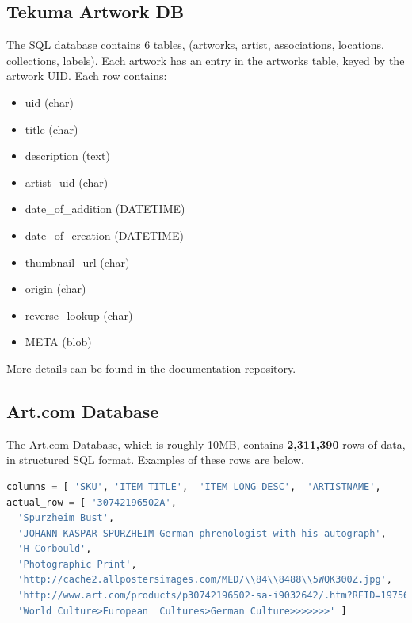 \documentclass[fontsize=12pt]{scrartcl} %
\begin{document}
\subsection{Tekuma Artwork DB}
The SQL database contains 6 tables, (artworks, artist, associations, locations, collections, labels). Each artwork has an entry in the artworks table, keyed by the artwork UID. Each row contains:
\begin{itemize}
    \item uid (char)
    \item title (char)
    \item description (text)
    \item artist\_uid (char)
    \item date\_of\_addition (DATETIME)
    \item date\_of\_creation (DATETIME)
    \item thumbnail\_url (char)
    \item origin (char)
    \item reverse\_lookup (char)
    \item META (blob)
\end{itemize}
More details can be found in the documentation repository.

\subsection{Art.com Database}
The Art.com Database, which is roughly 10MB, contains \textbf{2,311,390} rows of data, in structured SQL format. Examples of these rows are below.\\

\begin{lstlisting}[language=Python]
columns = [ 'SKU', 'ITEM_TITLE',  'ITEM_LONG_DESC',  'ARTISTNAME',    'ITEM_TYPE',  'IMAGE_URL',  'PRODUCT_URL', 'PRODUCT_TAXONOMY' ]
actual_row = [ '30742196502A',
  'Spurzheim Bust',
  'JOHANN KASPAR SPURZHEIM German phrenologist with his autograph',
  'H Corbould',
  'Photographic Print',
  'http://cache2.allpostersimages.com/MED/\\84\\8488\\5WQK300Z.jpg',
  'http://www.art.com/products/p30742196502-sa-i9032642/.htm?RFID=197560',
  'World Culture>European  Cultures>German Culture>>>>>>>' ]
\end{lstlisting}
\end{document}
